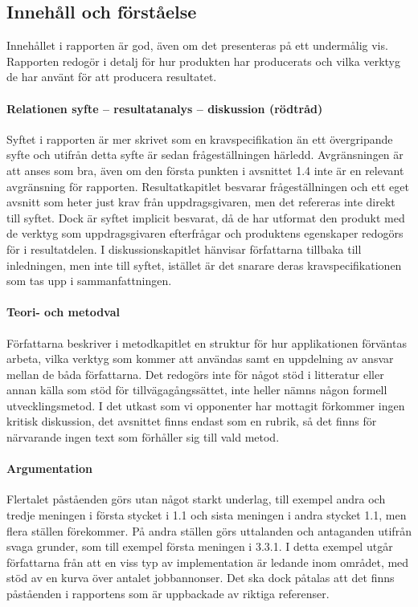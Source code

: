     \subsection{Innehåll och förståelse} %
    \label{sub:innehall}
    Innehållet i rapporten är god, även om det presenteras på ett undermålig vis. Rapporten redogör i detalj för hur produkten har producerats och vilka verktyg de har använt för att producera resultatet.

    \paragraph{Relationen syfte – resultatanalys – diskussion (rödtråd)}
        Syftet i rapporten är mer skrivet som en kravspecifikation än ett övergripande syfte och utifrån detta syfte är sedan frågeställningen härledd. Avgränsningen är att anses som bra, även om den första punkten i avsnittet 1.4 inte är en relevant avgränsning för rapporten. Resultatkapitlet besvarar frågeställningen och ett eget avsnitt som heter just krav från uppdragsgivaren, men det refereras inte direkt till syftet. Dock är syftet implicit besvarat, då de har utformat den produkt med de verktyg som uppdragsgivaren efterfrågar och produktens egenskaper redogörs för i resultatdelen. I diskussionskapitlet hänvisar författarna tillbaka till inledningen, men inte till syftet, istället är det snarare deras kravspecifikationen som tas upp i sammanfattningen.

    \paragraph{Teori- och metodval}
        Författarna beskriver i metodkapitlet en struktur för hur applikationen förväntas arbeta, vilka verktyg som kommer att användas samt en uppdelning av ansvar mellan de båda författarna. Det redogörs inte för något stöd i litteratur eller annan källa som stöd för tillvägagångssättet, inte heller nämns någon formell utvecklingsmetod. I det utkast som vi opponenter har mottagit förkommer ingen kritisk diskussion, det avsnittet finns endast som en rubrik, så det finns för närvarande ingen text som förhåller sig till vald metod.

    \paragraph{Argumentation}
        Flertalet påståenden görs utan något starkt underlag, till exempel andra och tredje meningen i första stycket i 1.1 och sista meningen i andra stycket 1.1, men flera ställen förekommer. På andra ställen görs uttalanden och antaganden utifrån svaga grunder, som till exempel första meningen i 3.3.1. I detta exempel utgår författarna från att en viss typ av implementation är ledande inom området, med stöd av en kurva över antalet jobbannonser. Det ska dock påtalas att det finns påståenden i rapportens som är uppbackade av riktiga referenser.

